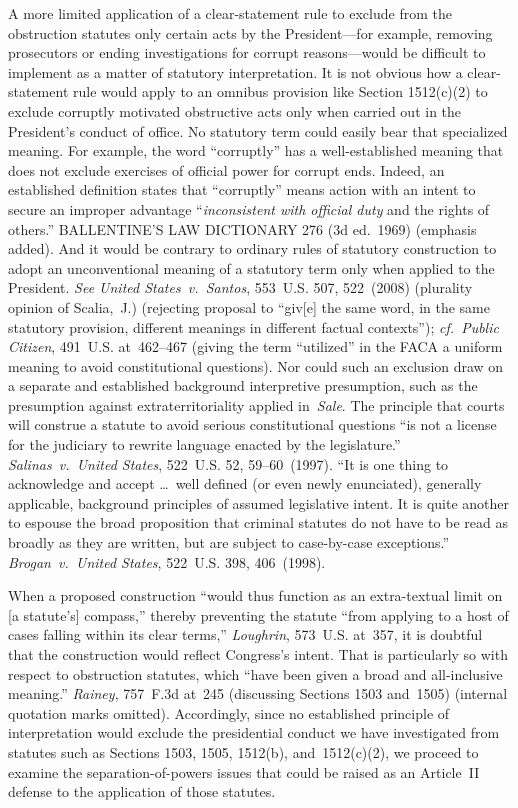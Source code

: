 A more limited application of a clear-statement rule to exclude from the obstruction statutes only certain acts by the President---for example, removing prosecutors or ending investigations for corrupt reasons---would be difficult to implement as a matter of statutory interpretation.
It is not obvious how a clear-statement rule would apply to an omnibus provision like Section 1512(c)(2) to exclude corruptly motivated obstructive acts only when carried out in the President's conduct of office.
No statutory term could easily bear that specialized meaning.
For example, the word ``corruptly'' has a well-established meaning that does not exclude exercises of official power for corrupt ends.
Indeed, an established definition states that ``corruptly'' means action with an intent to secure an improper advantage ``\textit{inconsistent with official duty} and the rights of others.''
BALLENTINE'S LAW DICTIONARY 276 (3d ed.~1969) (emphasis added).
And it would be contrary to ordinary rules of statutory construction to adopt an unconventional meaning of a statutory term only when applied to the President.
\textit{See United States~v.\ Santos}, 553~U.S. 507, 522~(2008) (plurality opinion of Scalia,~J.) (rejecting proposal to ``giv[e] the same word, in the same statutory provision, different meanings in different factual contexts'');
\textit{cf.~Public Citizen}, 491~U.S. at~462--467 (giving the term ``utilized'' in the FACA a uniform meaning to avoid constitutional questions).
Nor could such an exclusion draw on a separate and established background interpretive presumption, such as the presumption against extraterritoriality applied in~\textit{Sale}.
The principle that courts will construe a statute to avoid serious constitutional questions ``is not a license for the judiciary to rewrite language enacted by the legislature.''
\textit{Salinas~v.\ United States}, 522~U.S. 52, 59--60~(1997).
``It is one thing to acknowledge and accept \dots\ well defined (or even newly enunciated), generally applicable, background principles of assumed legislative intent.
It is quite another to espouse the broad proposition that criminal statutes do not have to be read as broadly as they are written, but are subject to case-by-case exceptions.''
\textit{Brogan~v.\ United States}, 522~U.S. 398, 406~(1998).

When a proposed construction ``would thus function as an extra-textual limit on [a statute's] compass,'' thereby preventing the statute ``from applying to a host of cases falling within its clear terms,'' \textit{Loughrin}, 573~U.S. at~357, it is doubtful that the construction would reflect Congress's intent.
That is particularly so with respect to obstruction statutes, which ``have been given a broad and all-inclusive meaning.''
\textit{Rainey}, 757~F.3d at~245 (discussing Sections 1503 and~1505) (internal quotation marks omitted).
Accordingly, since no established principle of interpretation would exclude the presidential conduct we have investigated from statutes such as Sections 1503, 1505, 1512(b), and~1512(c)(2), we proceed to examine the separation-of-powers issues that could be raised as an Article~II defense to the application of those statutes.

